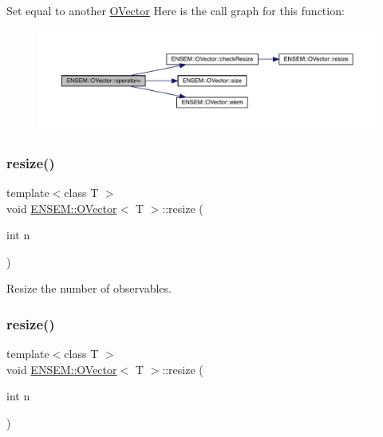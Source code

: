 Set equal to another \mbox{\hyperlink{classENSEM_1_1OVector}{O\+Vector}} Here is the call graph for this function\+:
\nopagebreak
\begin{figure}[H]
\begin{center}
\leavevmode
\includegraphics[width=350pt]{d0/d8d/classENSEM_1_1OVector_a7d5f2f5a6c1dc742f53cc4dabc86722e_cgraph}
\end{center}
\end{figure}
\mbox{\label{classENSEM_1_1OVector_a2758b982bf7fa25b69d31fe8d7f72762}} 
\subsubsection{\texorpdfstring{resize()}{resize()}\hspace{0.1cm}{\footnotesize\ttfamily [1/6]}}
{\footnotesize\ttfamily template$<$class T $>$ \\
void \mbox{\hyperlink{classENSEM_1_1OVector}{E\+N\+S\+E\+M\+::\+O\+Vector}}$<$ T $>$\+::resize (\begin{DoxyParamCaption}\item[{int}]{n }\end{DoxyParamCaption})\hspace{0.3cm}{\ttfamily [inline]}}



Resize the number of observables. 

\mbox{\label{classENSEM_1_1OVector_a2758b982bf7fa25b69d31fe8d7f72762}} 
\subsubsection{\texorpdfstring{resize()}{resize()}\hspace{0.1cm}{\footnotesize\ttfamily [2/6]}}
{\footnotesize\ttfamily template$<$class T $>$ \\
void \mbox{\hyperlink{classENSEM_1_1OVector}{E\+N\+S\+E\+M\+::\+O\+Vector}}$<$ T $>$\+::resize (\begin{DoxyParamCaption}\item[{int}]{n }\end{DoxyParamCaption})\hspace{0.3cm}{\ttfamily [inline]}}



